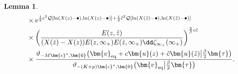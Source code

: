 \documentclass[pdftex]{sigma}
\numberwithin{equation}{section}
\newtheorem{Lemma}[Theorem]{Lemma}
\begin{document}
\begin{Lemma}
\begin{align*}
	& \quad{} \times{\rm e}^{\frac{1}{2}c^2 \mathcal{Q}[\ln(X(z) - \bullet),\ln(X(z) - \bullet)] + \frac{1}{2} \tilde{c}^2 \mathcal{Q}[\ln(X(\tilde{z}) - \bullet),\ln(X(\tilde{z}) - \bullet)]} \\
												 & \quad{} \times \biggl(\frac{E(z,\tilde{z})}{(X(\tilde{z}) - X(z))E(z,\infty_+)E(\tilde{z},\infty_+) \dd \zeta_{\infty_+}(\infty_+)}\biggr)^{\frac{2}{\beta}c\tilde{c}} \\
&\quad{}\times \frac{\vartheta_{-M\bm{\epsilon}^*,\bm{0}}\bigl(\bm{v}_{{\rm eq}} + c\bm{u}(z) + \tilde{c}\bm{u}(\tilde{z}) \big| \frac{\beta}{2} \bm{\tau}\bigr)}{\vartheta_{-(K+p)\bm{\epsilon}^{*},\bm{0}}\bigl(\bm{v}_{{\rm eq}}\big|\frac{\beta}{2}\bm{\tau}\bigr)}.
\end{align*}
\end{Lemma}
\end{document}
